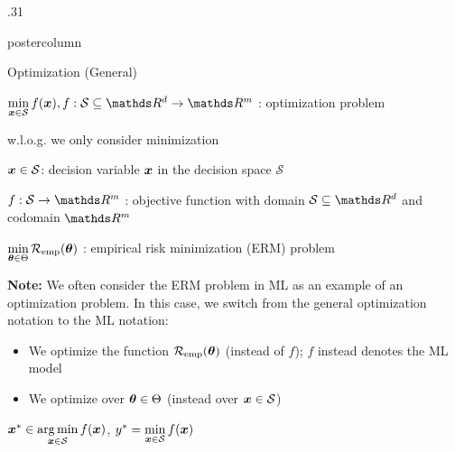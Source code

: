 \documentclass[11pt,compress,t,notes=noshow, xcolor=table]{beamer}
\newlength{\columnheight} %
\begin{document}
\begin{frame}[fragile]{}
\begin{columns}
	\begin{column}{.31\textwidth}
		\begin{beamercolorbox}[center]{postercolumn}
			\begin{minipage}{.98\textwidth}
				\parbox[t][\columnheight]{\textwidth}{
					\begin{myblock}{Optimization (General)}
						\begin{codebox}
							$\min\limits_{\xv \in \mathcal{S}} f(\xv), f: \mathcal{S}\subseteq \R^d \to \R^m$ :
							 optimization problem
						\end{codebox}
						\hspace*{1ex} w.l.o.g. we only consider minimization \\
						\begin{codebox}
							$\bm{x} \in \mathcal{S}$: decision variable $\bm{x}$ in the decision space $\mathcal{S}$
						\end{codebox}
						\hspace*{1ex}
						\begin{codebox}
							 $f: \mathcal{S} \to \R^m$ : objective function with domain $\mathcal{S} \subseteq \R^d$ and codomain $\R^m$
						\end{codebox}
						\hspace*{1ex} 
						\begin{codebox}
							$\min\limits_{\bm{\theta} \in \Theta} \mathcal{R}_{\text{emp}}(\bm{\theta})$ : empirical risk minimization (ERM) problem
						\end{codebox}
						\hspace*{1ex} \textbf{Note:} We often consider the ERM problem in ML as an example of an optimization problem. In this case, we switch from the general optimization notation to the ML notation: 
						\begin{itemize}
							\item We optimize the function $\mathcal{R}_{\text{emp}}(\bm{\theta})$ (instead of $f$); $f$ instead denotes the ML model
							\item We optimize over $\bm{\theta} \in \Theta$ (instead over $\bm{x} \in \mathcal{S}$) 
						\end{itemize}
						\hspace*{1ex}			
						\begin{codebox}
							 $\bm{x}^\ast \in \mathop{\mathrm{arg\,min}}\limits_{\bm{x} \in \mathcal{S}} f(\bm{x})$, $y^\ast = \min\limits_{\bm{x} \in \mathcal{S}} f(\bm{x})$

\end{codebox}
\end{myblock}}
\end{minipage}
\end{beamercolorbox}
\end{column}
\end{columns}
\end{frame}
\end{document}
